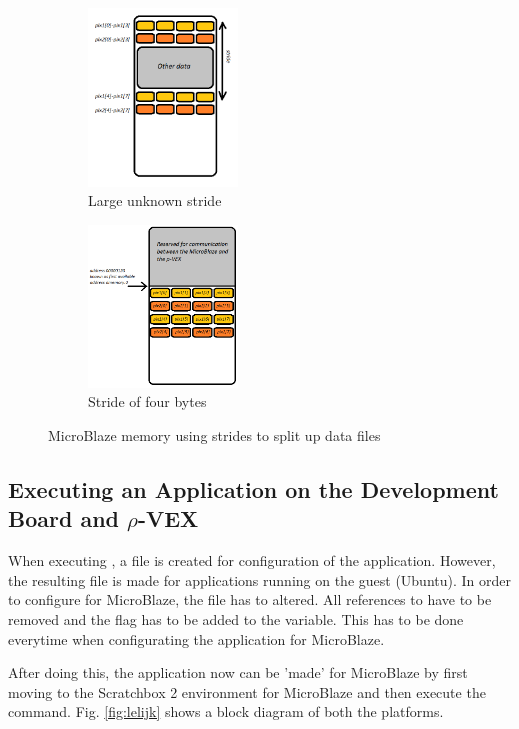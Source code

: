 \begin{figure}[htb]
	\centering
	\begin{subfigure}{0.3\textwidth}
		\centering
		\includegraphics[width=150px]{Pictures/stride}
		\caption{Large unknown stride}
		\label{fig:stride}
	\end{subfigure}
	\quad
	\begin{subfigure}{0.3\textwidth}
		\centering
		\includegraphics[width=150px]{Pictures/pixels_dmem}
		\caption{Stride of four bytes}
		\label{fig:testpixels}
	\end{subfigure}
\caption{MicroBlaze memory using strides to split up data files}%
\label{}%
\end{figure}

\subsection{Executing an Application on the Development Board and $\rho$-VEX}
\label{sec:executing}
When executing , a file is created for configuration of the application. However, the resulting  file is made for applications running on the guest (Ubuntu). In order to configure for MicroBlaze, the  file has to altered. All references to  have to be removed and the  flag has to be added to the  variable. This has to be done everytime when configurating the application for MicroBlaze.

After doing this, the application now can be 'made' for MicroBlaze by first moving to the Scratchbox 2 environment for MicroBlaze and then execute the  command. Fig. \ref{fig:lelijk} shows a block diagram of both the platforms.


